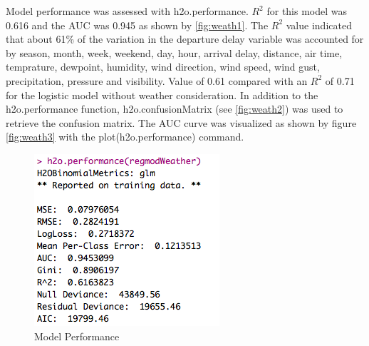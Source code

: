\documentclass[12pt,twoside]{amherstthesis}
\begin{document}
  Model performance was assessed with h2o.performance. \(R^{2}\) for this
  model was 0.616 and the AUC was 0.945 as shown by \autoref{fig:weath1}.
  The \(R^{2}\) value indicated that about 61\% of the variation in the
  departure delay variable was accounted for by season, month, week,
  weekend, day, hour, arrival delay, distance, air time, temprature,
  dewpoint, humidity, wind direction, wind speed, wind gust,
  precipitation, pressure and visibility. Value of 0.61 compared with an
  \(R^{2}\) of 0.71 for the logistic model without weather consideration.
  In addition to the h2o.performance function, h2o.confusionMatrix (see
  \autoref{fig:weath2}) was used to retrieve the confusion matrix. The AUC
  curve was visualized as shown by figure \autoref{fig:weath3} with the
  plot(h2o.performance) command.
  
  \begin{Shaded}
  \begin{Highlighting}[]
  \StringTok{ }\NormalTok{(mat$No[}\NormalTok{]+mat$Yes[}\NormalTok{])/(mat$No[}\NormalTok{]+}
  \StringTok{                                      }\NormalTok{mat$No[}\NormalTok{]+mat$Yes[}\NormalTok{]+}
  \StringTok{                                      }\NormalTok{mat$Yes[}\NormalTok{]) }
  \NormalTok{(}
  \end{Highlighting}
  \end{Shaded}
  
  \begin{figure}[htbp]
  \centering
  \includegraphics[scale = 0.7,angle = 0]{figure/regmodPerformWeather.png}
  \caption[Model Performance]{\normalsize{Model Performance}}
  \label{fig:weath1}
  \end{figure}
  
\end{document}
